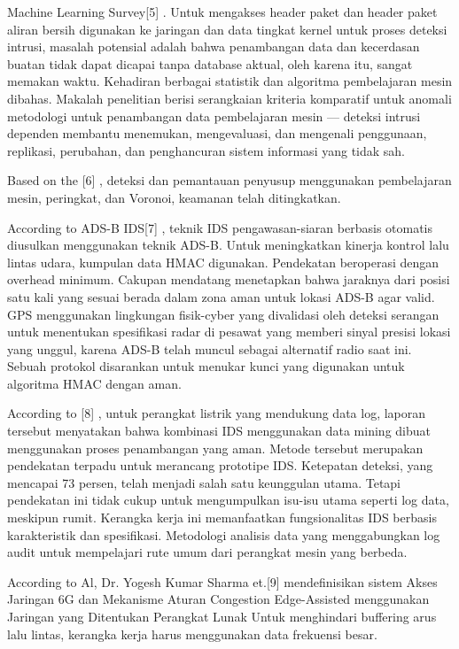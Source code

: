 \documentclass[conference]{IEEEtran}
\begin{document}
Machine Learning Survey[5] \cite {buczak2015survey}. Untuk mengakses header paket dan header paket aliran bersih digunakan ke jaringan dan data tingkat kernel untuk proses deteksi intrusi, masalah potensial adalah bahwa penambangan data dan kecerdasan buatan tidak dapat dicapai tanpa database aktual, oleh karena itu, sangat memakan waktu. Kehadiran berbagai statistik dan algoritma pembelajaran mesin dibahas. Makalah penelitian berisi serangkaian kriteria komparatif untuk anomali metodologi untuk penambangan data pembelajaran mesin — deteksi intrusi dependen membantu menemukan, mengevaluasi, dan mengenali penggunaan, replikasi, perubahan, dan penghancuran sistem informasi yang tidak sah.

Based on the [6] \cite {koli2017advanced}, deteksi dan pemantauan penyusup menggunakan pembelajaran mesin, peringkat, dan Voronoi, keamanan telah ditingkatkan.

According to ADS-B IDS[7] \cite {kacem2016ads}, teknik IDS pengawasan-siaran berbasis otomatis diusulkan menggunakan teknik ADS-B. Untuk meningkatkan kinerja kontrol lalu lintas udara, kumpulan data HMAC digunakan. Pendekatan beroperasi dengan overhead minimum. Cakupan mendatang menetapkan bahwa jaraknya dari posisi satu kali yang sesuai berada dalam zona aman untuk lokasi ADS-B agar valid. GPS menggunakan lingkungan fisik-cyber yang divalidasi oleh deteksi serangan untuk menentukan spesifikasi radar di pesawat yang memberi sinyal presisi lokasi yang unggul, karena ADS-B telah muncul sebagai alternatif radio saat ini. Sebuah protokol disarankan untuk menukar kunci yang digunakan untuk algoritma HMAC dengan aman.

According to [8] \cite {pan2015developing}, untuk perangkat listrik yang mendukung data log, laporan tersebut menyatakan bahwa kombinasi IDS menggunakan data mining dibuat menggunakan proses penambangan yang aman. Metode tersebut merupakan pendekatan terpadu untuk merancang prototipe IDS. Ketepatan deteksi, yang mencapai 73 persen, telah menjadi salah satu keunggulan utama. Tetapi pendekatan ini tidak cukup untuk mengumpulkan isu-isu utama seperti log data, meskipun rumit. Kerangka kerja ini memanfaatkan fungsionalitas IDS berbasis karakteristik dan spesifikasi. Metodologi analisis data yang menggabungkan log audit untuk mempelajari rute umum dari perangkat mesin yang berbeda.

According to Al, Dr. Yogesh Kumar Sharma et.[9] \cite {borole20206g} mendefinisikan sistem Akses Jaringan 6G dan Mekanisme Aturan Congestion Edge-Assisted menggunakan Jaringan yang Ditentukan Perangkat Lunak Untuk menghindari buffering arus lalu lintas, kerangka kerja harus menggunakan data frekuensi besar.
\end{document}
